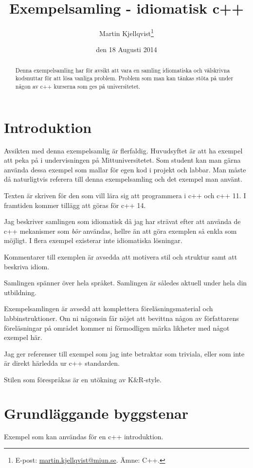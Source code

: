 \documentclass[a4paper,portrait]{miunart} %
\title{Exempelsamling - idiomatisk c++}
\author{Martin Kjellqvist\footnote{%
	E-post: \href{mailto:martin.kjellqvist@miun.se}{martin.kjellqvist@miun.se}.
	Ämne: C++.
}}
\date{den 18 Augusti 2014}
\begin{document}
\maketitle
\begin{abstract}
	\noindent
	Denna exempelsamling har för avsikt att vara en samling idiomatiska och 
	välskrivna kodsnuttar för att lösa vanliga problem. Problem som man kan 
	tänkas stöta på under någon av c++ kurserna som ges på universitetet.  
\end{abstract}


\section{Introduktion}
\label{sec:intro}
\noindent
Avsikten med denna exempelsamlig är flerfaldig. Huvudsyftet är att ha exempel 
att peka på i undervisningen på Mittuniversitetet. Som student kan man gärna 
använda dessa exempel som mallar för egen kod i projekt och labbar. Man måste 
då naturligtvis referera till denna exempelsamling och det exempel man använt. 

Texten är skriven för den som vill lära sig att programmera i c++ och c++ 
11. I framtiden kommer tillägg att göras för c++ 14. 

Jag beskriver samlingen som idiomatisk då jag har strävat efter att använda de 
c++ mekanismer som \emph{bör} användas, hellre än att göra exemplen så enkla 
som möjligt. I flera exempel existerar inte idiomatiska lösningar. 

Kommentarer till exemplen är avsedda att motivera stil och struktur samt att 
beskriva idiom.

Samlingen spänner över hela språket.  Samlingen är således aktuell under hela 
din utbildning.

Exempelsamlingen är avsedd att komplettera föreläsningsmaterial och 
labbinstruktioner.  Om ni någonsin får nöjet att bevittna någon av författarens 
föreläsningar på området kommer ni förmodligen märka likheter med något exempel 
här. 

Jag ger referenser till exempel som jag inte betraktar som triviala, eller som 
inte är direkt härledda ur c++ standarden.

Stilen som förespråkas är en utökning av K\&R-style.
\pagebreak
\tableofcontents
\pagebreak
\section{Grundläggande byggstenar}
\label{sec:basics}
\noindent
Exempel som kan användas för en c++ introduktion.
\end{document}

